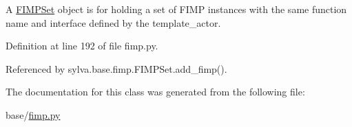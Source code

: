 A \hyperlink{classsylva_1_1base_1_1fimp_1_1_f_i_m_p_set}{F\+I\+M\+P\+Set} object is for holding a set of F\+I\+MP instances with the same function name and interface defined by the template\+\_\+actor. 



Definition at line 192 of file fimp.\+py.



Referenced by sylva.\+base.\+fimp.\+F\+I\+M\+P\+Set.\+add\+\_\+fimp().



The documentation for this class was generated from the following file\+:\begin{DoxyCompactItemize}
\item 
base/\hyperlink{fimp_8py}{fimp.\+py}\end{DoxyCompactItemize}
